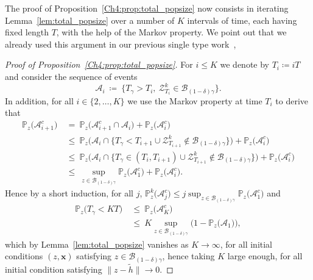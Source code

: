 \begin{refsegment}
 The proof of Proposition~\ref{Ch4:prop:total_popsize} now consists in iterating Lemma~\ref{lem:total_popsize} over a number of $K$ intervals of time, each having fixed length $T$, with the help of the Markov property. We point out that we already used this argument in our previous single type work~\citep{AFRS_2025},
\begin{proof}[Proof of Proposition~\ref{Ch4:prop:total_popsize}]
For $i\leq K$ we denote by $T_i\coloneqq iT$ and consider the sequence of events
\begin{equation*}
    \mathcal{A}_i\ \coloneqq\ \big\{ T_{\gamma} > T_i,\ \mathcal{Z}^k_{T_i} \in \mathscr{B}_{(1-\delta)\gamma}\big\}.
\end{equation*}
In addition, for all $i\in \{2,\ldots,K \}$ we use the Markov property at time $T_i$ to derive that
\begin{equation}\label{Ch4:eq:itarating_lemma_totalpop}
\begin{aligned}
    \mathbb{P}_{z}\big(\mathcal{A}_{i+1}^c\big)\ &=\ \mathbb{P}_{z}\big(\mathcal{A}_{i+1}^c\cap \mathcal{A}_{i}\big)+\mathbb{P}_{z}\big(\mathcal{A}_{i}^c\big)\\
    &\leq\ \mathbb{P}_{z}\big(\mathcal{A}_{i} \cap \{T_{\gamma}<T_{i+1} \cup \mathcal{Z}^k_{T_{i+1}}\not\in \mathscr{B}_{(1-\delta)\gamma} \}\big)  +  \mathbb{P}_{z}\big(\mathcal{A}_{i}^c\big) \\
    &\leq\ \mathbb{P}_{z}\big(\mathcal{A}_{i} \cap \{T_{\gamma}\in (T_i, T_{i+1}) \cup \mathcal{Z}^k_{T_{i+1}}\not\in \mathscr{B}_{(1-\delta)\gamma} \}\big)  +  \mathbb{P}_{z}\big(\mathcal{A}_{i}^c\big) \\
    &\leq\ \sup_{z \in \mathscr{B}_{(1-\delta)\gamma}} \mathbb{P}_{z}\big(\mathcal{A}_{1}^c\big) +  \mathbb{P}_{z}\big(\mathcal{A}_{i}^c\big) .
\end{aligned}
\end{equation}
Hence by a short induction, for all $j$,
$\mathbb{P}^k_{z}\big(\mathcal{A}^c_j\big)\leq  j\sup_{z \in \mathscr{B}_{(1-\delta)\gamma}}\mathbb{P}_{z}\big(\mathcal{A}^c_1\big)$ and 
\begin{align*}
    \mathbb{P}_{z}\big( T_{\gamma} < KT \big)
    \ &\leq\
    \mathbb{P}_{z}\big( \mathcal{A}^c_K \big) 
    \\
    &\leq\ K\sup_{z \in \mathscr{B}_{(1-\delta)\gamma}}\big(1- \mathbb{P}_{z}\big(\mathcal{A}_1\big)\big),
\end{align*}
which by Lemma~\ref{lem:total_popsize} vanishes as $K\to\infty$, for all initial conditions $(z, \bm x)$ satisfying $z \in \mathscr{B}_{(1-\delta)\gamma}$, hence taking $K$ large enough, for all initial condition satisfying $\lVert z - \tilde h\rVert\to 0$.
\end{proof}


\end{refsegment}
